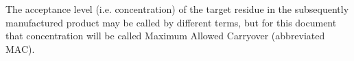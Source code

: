The acceptance level (i.e. concentration) of the target residue in the subsequently manufactured product may be called by different terms, but for this document that concentration will be called Maximum Allowed Carryover (abbreviated MAC).\relax